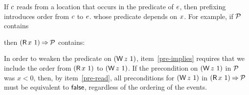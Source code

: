 If $c$ reads from a location that occurs in the predicate of $e$, then
prefixing introduces order from $c$ to $e$.
whose predicate depends on $x$. 
For example, if $\mathcal{P}$ contains %
\begin{tikzinline}[node distance=1em]
\end{tikzinline}
then $(\DR{x}{1})\prefix\aPSS$ contains:
\begin{displaymathsmall}
\begin{tikzcenter}[node distance=1em]
\end{tikzcenter}
\qquad{}\qquad
\begin{tikzcenter}[node distance=1em]
\end{tikzcenter}
\end{displaymathsmall}
In order to weaken the predicate on $(\DW{z}{1})$, item~\ref{pre-implies}
requires that we include the order from $(\DR{x}{1})$ to $(\DW{z}{1})$.
If the precondition on $(\DW{z}{1})$ in $\mathcal{P}$ was $x<0$, then, by
item~\ref{pre-read}, all preconditions for $(\DW{z}{1})$ in
$(\DR{x}{1})\prefix\aPSS$ must be equivalent to $\mathsf{false}$, regardless of
the ordering of the events.



